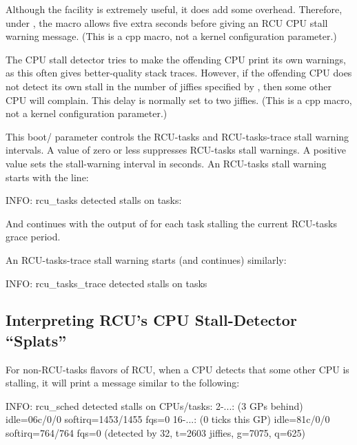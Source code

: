 \begin{description}[style=nextline]
\item[\tco{RCU_STALL_DELAY_DELTA}]
	Although the  facility is extremely useful, it does add
	some overhead.
	Therefore, under , the
	 macro allows five extra seconds before
	giving an RCU CPU stall warning message.
	(This is a cpp
	macro, not a kernel configuration parameter.)

\item[\tco{RCU_STALL_RAT_DELAY}]
	The CPU stall detector tries to make the offending CPU print its
	own warnings, as this often gives better-quality stack traces.
	However, if the offending CPU does not detect its own stall in
	the number of jiffies specified by , then
	some other CPU will complain.
	This delay is normally set to
	two jiffies.
	(This is a cpp macro, not a kernel configuration
	parameter.)

\item[\tco{rcupdate.rcu_task_stall_timeout}]
	This boot/ parameter controls the RCU-tasks and
	RCU-tasks-trace stall warning intervals.
	A value of zero or less
	suppresses RCU-tasks stall warnings.
	A positive value sets the
	stall-warning interval in seconds.
	An RCU-tasks stall warning
	starts with the line:

\begin{VerbatimU}[gobble=2]
		INFO: rcu_tasks detected stalls on tasks:
\end{VerbatimU}

	And continues with the output of  for each
	task stalling the current RCU-tasks grace period.

	An RCU-tasks-trace stall warning starts (and continues) similarly:

\begin{VerbatimU}[gobble=2]
		INFO: rcu_tasks_trace detected stalls on tasks
\end{VerbatimU}
\end{description}

\subsection{Interpreting RCU's CPU Stall-Detector ``Splats''}

For non-RCU-tasks flavors of RCU, when a CPU detects that some other
CPU is stalling, it will print a message similar to the following:

\begin{VerbatimU}
	INFO: rcu_sched detected stalls on CPUs/tasks:
	2-...: (3 GPs behind) idle=06c/0/0 softirq=1453/1455 fqs=0
	16-...: (0 ticks this GP) idle=81c/0/0 softirq=764/764 fqs=0
	(detected by 32, t=2603 jiffies, g=7075, q=625)
\end{VerbatimU}

